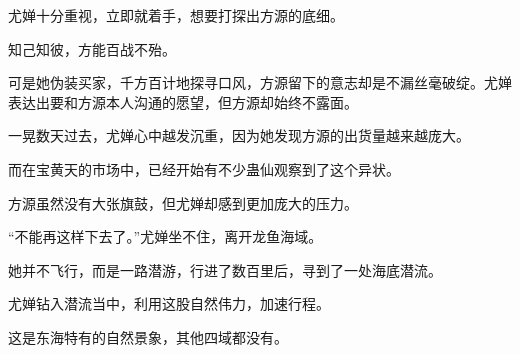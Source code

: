 \begin{this_body}
尤婵十分重视，立即就着手，想要打探出方源的底细。

知己知彼，方能百战不殆。

可是她伪装买家，千方百计地探寻口风，方源留下的意志却是不漏丝毫破绽。尤婵表达出要和方源本人沟通的愿望，但方源却始终不露面。

一晃数天过去，尤婵心中越发沉重，因为她发现方源的出货量越来越庞大。

而在宝黄天的市场中，已经开始有不少蛊仙观察到了这个异状。

方源虽然没有大张旗鼓，但尤婵却感到更加庞大的压力。

“不能再这样下去了。”尤婵坐不住，离开龙鱼海域。

她并不飞行，而是一路潜游，行进了数百里后，寻到了一处海底潜流。

尤婵钻入潜流当中，利用这股自然伟力，加速行程。

这是东海特有的自然景象，其他四域都没有。

\end{this_body}

